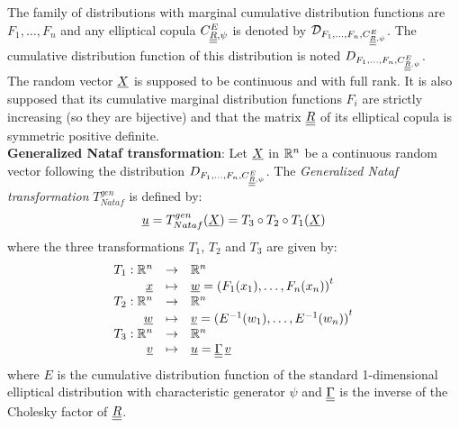{  The family of distributions with marginal cumulative distribution functions are $F_1,\dots,F_n$ and any elliptical copula $C^E_{{\underline{\underline{R}}},\psi}$ is denoted by ${{\mathcal D}}_{F_1,\dots,F_n,C^E_{{\underline{\underline{R}}},\psi}}$. The cumulative distribution function of this distribution is noted $D_{F_1,\dots,F_n,C^E_{{\underline{\underline{R}}},\psi}}$.\\

  The random vector ${\underline{X}}$ is supposed to be continuous and with full rank. It is also supposed that its cumulative marginal distribution functions $F_i$  are strictly increasing (so they are bijective) and that the matrix ${\underline{\underline{R}}}$ of its elliptical copula is symmetric positive definite.\\

  {\bf Generalized Nataf transformation}:   Let ${\underline{X}}$ in ${\mathbb R}^n$ be a continuous random vector following the distribution $D_{F_1,\dots,F_n,C^E_{{\underline{\underline{R}}},\psi}}$. The \emph{Generalized Nataf transformation} $T_{Nataf}^{gen}$ is defined by:
  \begin{equation}
    {\underline{u}} = T_{Nataf}^{gen}({\underline{X}})=T_3\circ T_2\circ T_1({\underline{X}})
  \end{equation}
  where the three transformations $T_1$, $T_2$ and $T_3$ are given by:
  \begin{equation}
    \begin{array}{l}
      \begin{array}{rcl}
        T_1 : {\mathbb R}^n & \rightarrow & {\mathbb R}^n\\
        {\underline{x}} & \mapsto & {\underline{w}}={{(F_1(x_1),\dots,F_n(x_n))}^t}
      \end{array}\\
      \begin{array}{rcl}
        T_2 : {\mathbb R}^n & \rightarrow & {\mathbb R}^n\\
        {\underline{w}} & \mapsto & {\underline{v}}={{(E^{-1}(w_1),\dots,E^{-1}(w_n))}^t}
      \end{array}\\
      \begin{array}{rcl}
        T_3 : {\mathbb R}^n & \rightarrow & {\mathbb R}^n\\
        {\underline{v}} & \mapsto & {\underline{u}}={\underline{\underline{\Gamma}}}\,{\underline{v}}
      \end{array}
    \end{array}
  \end{equation}
  where $E$ is the cumulative distribution function of the standard 1-dimensional elliptical distribution with characteristic generator $\psi$ and ${\underline{\underline{\Gamma}}}$ is the inverse of the Cholesky factor of ${\underline{\underline{R}}}$.\\

}
